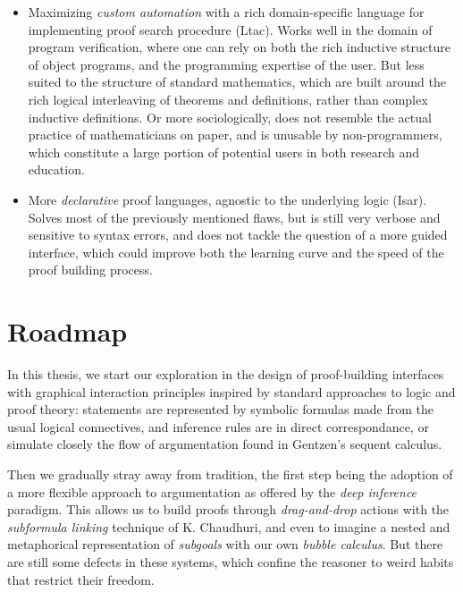 \begin{itemize}
  \item Maximizing \emph{custom automation} with a rich domain-specific language
  for implementing proof search procedure (Ltac). Works well in the domain of
  program verification, where one can rely on both the rich inductive structure
  of object programs, and the programming expertise of the user. But less suited
  to the structure of standard mathematics, which are built around the rich
  logical interleaving of theorems and definitions, rather than complex
  inductive definitions. Or more sociologically, does not resemble the actual
  practice of mathematicians on paper, and is unusable by non-programmers, which
  constitute a large portion of potential users in both research and education.
  \item More \emph{declarative} proof languages, agnostic to the underlying
  logic (Isar). Solves most of the previously mentioned flaws, but is still very
  verbose and sensitive to syntax errors, and does not tackle the question of a
  more guided interface, which could improve both the learning curve and the
  speed of the proof building process.
\end{itemize}

\section{Roadmap}

In this thesis, we start our exploration in the design of proof-building
interfaces with graphical interaction principles inspired by standard approaches
to logic and proof theory: statements are represented by symbolic formulas made
from the usual logical connectives, and inference rules are in direct
correspondance, or simulate closely the flow of argumentation found in Gentzen's
sequent calculus.

Then we gradually stray away from tradition, the first step being the adoption
of a more flexible approach to argumentation as offered by the \emph{deep
inference} paradigm. This allows us to build proofs through \emph{drag-and-drop}
actions with the \emph{subformula linking} technique of K. Chaudhuri, and even
to imagine a nested and metaphorical representation of \emph{subgoals} with our
own \emph{bubble calculus}. But there are still some defects in these systems,
which confine the reasoner to weird habits that restrict their freedom.

